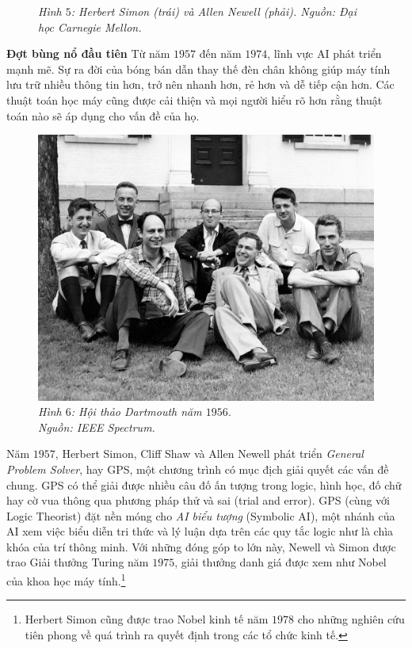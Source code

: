 \begin{multicols}{2}
\begin{figure}[H]
		\caption{\small\textit{\color{cackithi}Hình $5$: Herbert Simon (trái) và Allen Newell (phải). Nguồn: Đại học Carnegie Mellon.}}
		\vspace*{-10pt}
	\end{figure}
	\textbf{\color{cackithi}Đợt bùng nổ đầu tiên}
	\vskip 0.1cm
	Từ năm $1957$ đến năm $1974$, lĩnh vực AI phát triển mạnh mẽ. Sự ra đời của bóng bán dẫn thay thế đèn chân không giúp máy tính lưu trữ nhiều thông tin hơn, trở nên nhanh hơn, rẻ hơn và dễ tiếp cận hơn. Các thuật toán học máy cũng được cải thiện và mọi người hiểu rõ hơn rằng thuật toán nào sẽ áp dụng cho vấn đề của họ.
	\begin{figure}[H]
		\vspace*{5pt}
		\centering
		\captionsetup{labelformat= empty, justification=centering}
		\includegraphics[width= 1\linewidth]{Dartmouth.jpg}
		\caption{\small\textit{\color{cackithi}Hình $6$: Hội thảo Dartmouth năm $1956$.\\ Nguồn: IEEE Spectrum.}}
		\vspace*{-10pt}
	\end{figure}
	Năm $1957$, Herbert Simon, Cliff Shaw và Allen Newell phát triển \textit{General Problem Solver}, hay GPS, một chương trình có mục địch giải quyết các vấn đề chung. GPS có thể giải được nhiều câu đố ấn tượng trong logic, hình học, đố chữ hay cờ vua thông qua phương pháp thử và sai (trial and error). GPS (cùng với Logic Theorist) đặt nền móng cho \textit{AI biểu tượng} (Symbolic AI), một nhánh của AI xem việc biểu diễn tri thức và lý luận dựa trên các quy tắc logic như là chìa khóa của trí thông minh. Với những đóng góp to lớn này, Newell và Simon được trao Giải thưởng Turing năm $1975$, giải thưởng danh giá được xem như Nobel của khoa học máy tính.\footnote{\color{cackithi}Herbert Simon cũng được trao Nobel kinh tế năm $1978$ cho những nghiên cứu tiên phong về quá trình ra quyết định trong các tổ chức kinh tế.}

\end{multicols}
